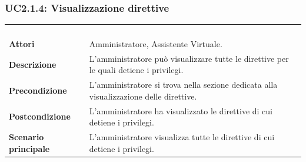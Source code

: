 \subsubsection{UC2.1.4: Visualizzazione direttive }
\label{UC2.1.4}
\begin{longtable}{l|p{10cm}}
	\rowcolor[gray]{0.8} \multicolumn{2}{c}{} \\
	\rowcolor[gray]{0.8} \multicolumn{2}{c}{\textbf{UC2.1.4 - Visualizzazione direttive }} \\
	\rowcolor[gray]{0.8} \multicolumn{2}{c}{} \\
	\hline
	&\\
	\textbf{Attori} & Amministratore, Assistente Virtuale.\\[7pt]
	\textbf{Descrizione} & L'amministratore può visualizzare tutte le direttive per le quali detiene i privilegi.\\[7pt]
	\textbf{Precondizione} & L'amministratore si trova nella sezione dedicata alla visualizzazione delle direttive.\\[7pt]
	\textbf{Postcondizione} & L'amministratore ha visualizzato le direttive di cui detiene i privilegi.\\[7pt]
	\textbf{Scenario principale} &L'amministratore visualizza tutte le direttive di cui detiene i privilegi.\\[7pt]\hline
\end{longtable}

